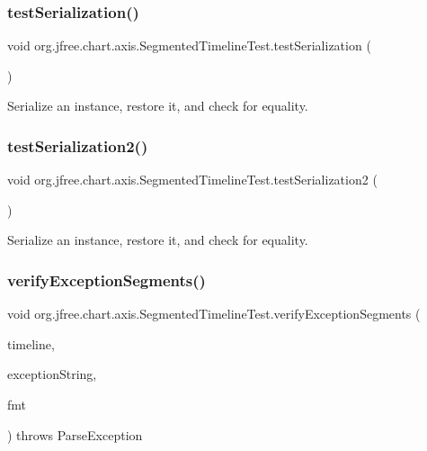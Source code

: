 \subsubsection{\texorpdfstring{test\+Serialization()}{testSerialization()}}
{\footnotesize\ttfamily void org.\+jfree.\+chart.\+axis.\+Segmented\+Timeline\+Test.\+test\+Serialization (\begin{DoxyParamCaption}{ }\end{DoxyParamCaption})}

Serialize an instance, restore it, and check for equality. \mbox{\label{classorg_1_1jfree_1_1chart_1_1axis_1_1_segmented_timeline_test_a085a28a76361d91e550aedd8b98952f2}} 
\subsubsection{\texorpdfstring{test\+Serialization2()}{testSerialization2()}}
{\footnotesize\ttfamily void org.\+jfree.\+chart.\+axis.\+Segmented\+Timeline\+Test.\+test\+Serialization2 (\begin{DoxyParamCaption}{ }\end{DoxyParamCaption})}

Serialize an instance, restore it, and check for equality. \mbox{\label{classorg_1_1jfree_1_1chart_1_1axis_1_1_segmented_timeline_test_ae56b03cb944a7f486e2bba786e24eb5a}} 
\subsubsection{\texorpdfstring{verify\+Exception\+Segments()}{verifyExceptionSegments()}}
{\footnotesize\ttfamily void org.\+jfree.\+chart.\+axis.\+Segmented\+Timeline\+Test.\+verify\+Exception\+Segments (\begin{DoxyParamCaption}\item[{\mbox{\hyperlink{classorg_1_1jfree_1_1chart_1_1axis_1_1_segmented_timeline}{Segmented\+Timeline}}}]{timeline,  }\item[{String \mbox{[}$\,$\mbox{]}}]{exception\+String,  }\item[{Format}]{fmt }\end{DoxyParamCaption}) throws Parse\+Exception}

